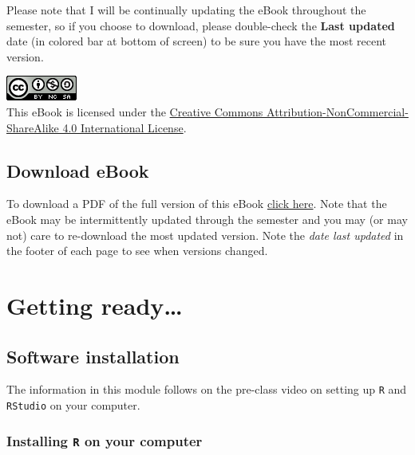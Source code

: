 \documentclass[
]{book}
\begin{document}
Please note that I will be continually updating the eBook throughout the semester, so if you choose to download, please double-check the \textbf{Last updated} date (in colored bar at bottom of screen) to be sure you have the most recent version.

\includegraphics{images/by-nc-sa.png}\\
This eBook is licensed under the \href{http://creativecommons.org/licenses/by-nc-sa/4.0/}{Creative Commons Attribution-NonCommercial-ShareAlike 4.0 International License}.

\hypertarget{download-ebook}{%
\chapter*{Download eBook}\label{download-ebook}}

To download a PDF of the full version of this eBook \href{EPI563-SpatialEPI-eBook.pdf}{click here}. Note that the eBook may be intermittently updated through the semester and you may (or may not) care to re-download the most updated version. Note the \emph{date last updated} in the footer of each page to see when versions changed.

\hypertarget{part-getting-ready}{%
\part{Getting ready\ldots{}}\label{part-getting-ready}}

\hypertarget{software-installation}{%
\chapter*{Software installation}\label{software-installation}}

The information in this module follows on the pre-class video on setting up \texttt{R} and \texttt{RStudio} on your computer.

\hypertarget{installing-r-on-your-computer}{%
\section*{\texorpdfstring{Installing \texttt{R} on your computer}{Installing R on your computer}}\label{installing-r-on-your-computer}}
\end{document}
